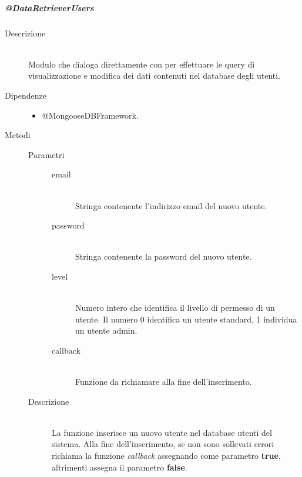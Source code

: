 \subparagraph{@DataRetrieverUsers}
\begin{description}
 \item[Descrizione] \hfill \\
 Modulo che dialoga direttamente con  per effettuare le query di visualizzazione e modifica dei dati contenuti nel database degli utenti.
 \item[Dipendenze] \hfill 
 	\begin{itemize}
 		\item @MongooseDBFramework.
 	\end{itemize}
 \item[Metodi]
 	\begin{mldescription}
 		 \hfill
 			\begin{description}
 				\item[Parametri] \hfill
 					\begin{description}
 						\item[email] \hfill \\
 							Stringa contenente l'indirizzo email del nuovo utente.
 						\item[password] \hfill \\
 							Stringa contenente la password del nuovo utente.
 						\item[level] \hfill \\
 							Numero intero che identifica il livello di permesso di un utente. Il numero 0 identifica un utente standard, 1 individua un utente admin. 
 						\item[callback] \hfill \\
 							Funzione da richiamare alla fine dell'inserimento.
 					\end{description}
 				\item[Descrizione] \hfill \\
 				La funzione inserisce un nuovo utente nel database utenti del sistema. Alla fine 	dell'inserimento, se non sono sollevati errori richiama la funzione \textit{callback} assegnando come parametro \textbf{true}, altrimenti assegna il parametro \textbf{false}.
 			\end{description}
 			

\end{mldescription}
\end{description}
